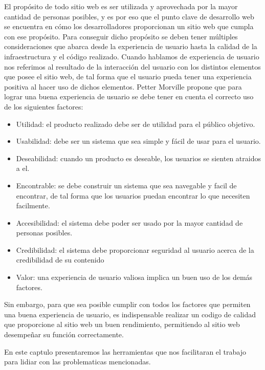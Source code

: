 El propósito de todo sitio web es ser utilizada y aprovechada por la mayor cantidad de personas posibles, y es por eso que el punto clave de desarrollo web se encuentra en cómo los desarrolladores proporcionan un sitio web que cumpla con ese propósito. Para conseguir dicho propósito se deben tener múltiples consideraciones que abarca desde la experiencia de usuario hasta la calidad de la infraestructura y el código realizado. Cuando hablamos de experiencia de usuario nos referimos al resultado de la interacción del usuario con los distintos elementos que posee el sitio web, de tal forma que el usuario pueda tener una experiencia positiva al hacer uso de dichos elementos. Petter Morville \cite{UXFactors} propone que para lograr una buena experiencia de usuario se debe tener en cuenta el correcto uso de los siguientes factores: 

\begin{itemize}
    \item Utilidad: el producto realizado debe ser de utilidad para el público objetivo.
    \item Usabilidad: debe ser un sistema que sea simple y fácil de usar para el usuario.
    \item Deseabilidad: cuando un producto es deseable, los usuarios se sienten atraidos a el.
    \item Encontrable: se debe construir un sistema que sea navegable y facil de encontrar, de tal forma que los usuarios puedan encontrar lo que necesiten facilmente.
    \item Accesibilidad: el sistema debe poder ser usado por la mayor cantidad de personas posibles.
    \item Credibilidad: el sistema debe proporcionar seguridad al usuario acerca de la credibilidad de su contenido
    \item Valor: una experiencia de usuario valiosa implica un buen uso de los demás factores.
\end{itemize}

Sin embargo, para que sea posible cumplir con todos los factores que permiten una buena experiencia de usuario, es indispensable realizar un codigo de calidad que proporcione al sitio web un buen rendimiento, permitiendo al sitio web desempeñar su función correctamente.

En este captulo presentaremos las herramientas que nos facilitaran el trabajo para lidiar con las problematicas mencionadas.

